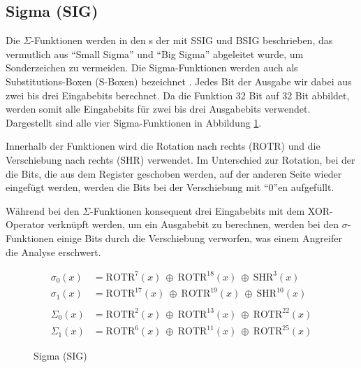 \subsection{Sigma (SIG)}
Die $\Sigma$-Funktionen werden in den s der  mit SSIG und BSIG beschrieben, das vermutlich aus "`Small Sigma"' und "`Big Sigma"' abgeleitet wurde,
um Sonderzeichen zu vermeiden. Die Sigma-Funktionen werden auch als Substitutions-Boxen (S-Boxen) bezeichnet \cite[1]{sha256analyse}. Jedes Bit der Ausgabe wir dabei
aus zwei bis drei Eingabebits berechnet. Da die Funktion 32 Bit auf 32 Bit abbildet, werden somit alle Eingabebits für zwei bis drei Ausgabebits verwendet.
Dargestellt sind alle vier Sigma-Funktionen in Abbildung \ref{eq:sig}.

Innerhalb der Funktionen wird die Rotation nach rechts (ROTR) und die Verschiebung nach rechts (SHR) verwendet. Im Unterschied zur Rotation, bei der die Bits,
die aus dem Register geschoben werden, auf der anderen Seite wieder eingefügt werden, werden die Bits bei der Verschiebung mit "`$0$"'en aufgefüllt.

Während bei den $\Sigma$-Funktionen konsequent drei Eingabebits mit dem XOR-Operator verknüpft werden, um ein Ausgabebit zu berechnen, werden bei den $\sigma$-Funktionen
einige Bits durch die Verschiebung verworfen, was einem Angreifer die Analyse erschwert.

\begin{figure}[!h]
  \begin{align}
  \sigma_0(x) &= \text{ROTR}^{7}(x)~\oplus~\text{ROTR}^{18}(x)~\oplus~\text{SHR}^{3}(x) \nonumber\\
  \sigma_1(x) &= \text{ROTR}^{17}(x)~\oplus~\text{ROTR}^{19}(x)~\oplus~\text{SHR}^{10}(x) \nonumber\\
  \nonumber\\
  \Sigma_0(x) &= \text{ROTR}^{2}(x)~\oplus~\text{ROTR}^{13}(x)~\oplus~\text{ROTR}^{22}(x) \nonumber\\
  \Sigma_1(x) &= \text{ROTR}^{6}(x)~\oplus~\text{ROTR}^{11}(x)~\oplus~\text{ROTR}^{25}(x) \nonumber
  \end{align}
  \caption{Sigma (SIG)}
  \label{eq:sig}
\end{figure}
